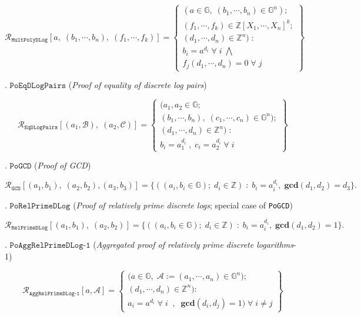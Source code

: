 \documentclass[11pt, lettersize, notitlepage, leqno, footskip=0.6cm]{article}
\newcommand{\bz}{\mathbb Z}
\newcommand{\ttt}{\texttt}
\newcommand{\mc}{\mathcal}
\newcommand{\mb}{\mathbb}
\newcommand{\mbf}{\mathbf}
\newcommand{\noin}{\noindent}
\newcommand{\GCD}{\mbf{gcd}}
\numberwithin{equation}{section}
\begin{document}
{\[
  \mc{R}_{\ttt{MultPolyDLog}}[a,\; (b_1,\cdots, b_n),\; (f_1,\cdots,f_k)] = \left\{\begin{array}{l}
    (a\in\mb{G},\; (b_1,\cdots, b_n)\in\mb{G}^n);\\
    (f_1,\cdots,f_k)\in\bz[X_1,\cdots,X_n]^k;\\ 
    (d_1,\cdots,d_n)\in\bz^n)\;: \\
    b_i = a^{d_i}\;\forall\; i\;\bigwedge \;\\   f_j(d_1,\cdots,d_n) = 0\;\forall\; j 
  \end{array}\right\}
\]

\noin 7. $\ttt{PoEqDLogPairs}$ (\textit{Proof of equality of discrete log pairs}) \vspace{-0.3cm}

\[
  \mc{R}_{{\ttt{EqDLogPairs}}}[(a_1, \mc{B}),\; (a_2, \mc{C})] = \left\{\begin{array}{l}
  	(a_1,a_2\in\mb{G};\\
    (b_1,\cdots, b_n),\;(c_1,\cdots, c_n)\in\mb{G}^n);\\
    (d_1,\cdots,d_n)\in \bz^n)\;: \\
    b_i = a_1^{d_i}\;,\;c_i= a_2^{d_i} \;\forall\; i
  \end{array}\right\}
\]

\noin 8. $\ttt{PoGCD}$ (\textit{Proof of GCD}) \vspace{-0.5cm} 

\[\mc{R}_{{\ttt{GCD}}}[(a_1,b_1),\; (a_2,b_2),(a_3,b_3)] = \{((a_i, b_i\in\mb{G});\;d_i\in\bz)\;:\; b_i = a_i^{d_i},\;\GCD(d_1,d_2)=d_3  \} .\]


\noin 9. $\ttt{PoRelPrimeDLog}$ (\textit{Proof of relatively prime discrete logs}; special case of \verb|PoGCD|) \vspace{-0.7cm}

\[
\mc{R}_{\ttt{RelPrimeDLog}}[(a_1,b_1),\;(a_2,b_2)] = \{((a_i, b_i\in\mb{G});\;d_i\in\bz)\;:\; b_i = a_i^{d_i},\;\GCD(d_1,d_2)=1 \} .
\]

\noin 10. $\ttt{PoAggRelPrimeDLog-1}$ (\textit{Aggregated proof of relatively prime discrete logarithms}-1) \vspace{-0.2cm}

\[
  \mc{R}_{\ttt{AggRelPrimeDLog-1}}[a, \mc{A}] = \left\{\begin{array}{l}
    \big(a\in\mb{G},\;  \mc{A}:=(a_1,\cdots, a_n)\in\mb{G}^n);\\
    (d_1,\cdots,d_n)\in\bz^n\big): \\
    a_i = a^{d_i}\;\forall\;i\;\;,\;\; \GCD(d_i, d_j) = 1)\;\forall \;i\neq j   	
  \end{array}\right\}
\] 

}
\end{document}
